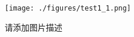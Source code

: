 
\begin{figure}[ht]
\centering
\texttt{[image: ./figures/test1\_1.png]}
\caption{请添加图片描述} \label{test1_fig1}
\end{figure}